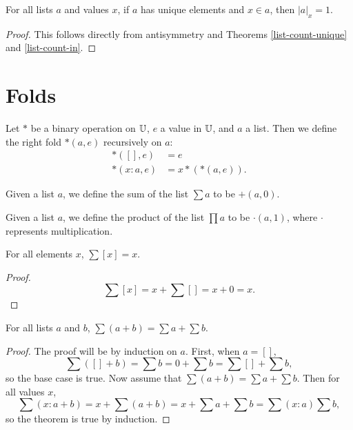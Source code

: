 \documentclass[../math.tex]{subfiles}
\begin{document}
\begin{theorem} \label{list-count-in-unique}
    For all lists $a$ and values $x$, if $a$ has unique elements and $x \in a$,
    then $|a|_x = 1$.
\end{theorem}
\begin{proof}
    This follows directly from antisymmetry and Theorems \ref{list-count-unique}
    and \ref{list-count-in}.
\end{proof}

\section{Folds}

\begin{definition}
    Let $*$ be a binary operation on $\mathbb{U}$, $e$ a value in $\mathbb{U}$, and $a$ a list.
    Then we define the right fold $*(a, e)$ recursively on $a$:
    \begin{align*}
           *([], e) &= e \\
        *(x : a, e) &= x * (*(a, e)).
    \end{align*}
\end{definition}

\begin{definition}
    Given a list $a$, we define the sum of the list $\sum a$ to be $+(a, 0)$.
\end{definition}

\begin{definition}
    Given a list $a$, we define the product of the list $\prod a$ to be
    $\cdot(a, 1)$, where $\cdot$ represents multiplication.
\end{definition}

\begin{theorem}
    For all elements $x$, $\sum [x] = x$.
\end{theorem}
\begin{proof}
    \[
        \sum [x] = x + \sum [] = x + 0 = x.
    \]
\end{proof}

\begin{theorem} \label{list-sum-conc}
    For all lists $a$ and $b$, $\sum (a + b) = \sum a + \sum b$.
\end{theorem}
\begin{proof}
    The proof will be by induction on $a$.  First, when $a = []$,
    \[
        \sum ([] + b) = \sum b = 0 + \sum b = \sum [] + \sum b,
    \]
    so the base case is true.  Now assume that $\sum (a + b) = \sum a + \sum b.$
    Then for all values $x$,
    \[
        \sum(x : a + b) = x + \sum(a + b) = x + \sum a + \sum b = \sum (x : a)
        \sum b,
    \]
    so the theorem is true by induction.
\end{proof}
\end{document}
